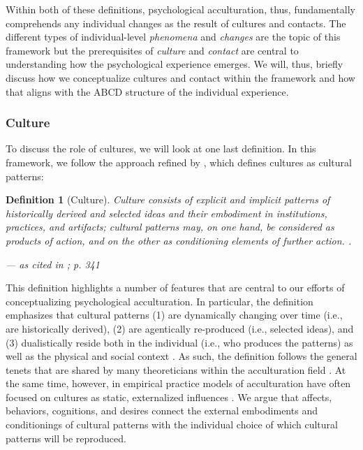 \documentclass[man, 12pt, a4paper, mask]{apa7}
\newtheorem{definition}{Definition}
\begin{document}
Within both of these definitions, psychological acculturation, thus, fundamentally comprehends any individual changes as the result of cultures and contacts. The different types of individual-level \textit{phenomena} and \textit{changes} are the topic of this framework but the prerequisites of \textit{culture} and \textit{contact} are central to understanding how the psychological experience emerges. We will, thus, briefly discuss how we conceptualize cultures and contact within the framework and how that aligns with the ABCD structure of the individual experience.
    
\subsubsection{Culture}
To discuss the role of cultures, we will look at one last definition. In this framework, we follow the approach refined by \citet[][]{adams2004}, which defines cultures as cultural patterns:
\begin{definition}[Culture]\label{def:culture}
Culture consists of explicit and implicit patterns of historically derived and selected ideas and their embodiment in institutions, practices, and artifacts; cultural patterns may, on one hand, be considered as products of action, and on the other as conditioning elements of further action. \citep[based on][p. 181]{kroeber1952}. 

\hfill--- as cited in \citealp[][]{adams2004}; p. 341
\end{definition}

This definition highlights a number of features that are central to our efforts of conceptualizing psychological acculturation. In particular, the definition emphasizes that cultural patterns (1) are dynamically changing over time (i.e., are historically derived), (2) are agentically re-produced (i.e., selected ideas), and (3) dualistically reside both in the individual (i.e., who produces the patterns) as well as the physical and social context \citep[i.e., which embodies and conditions;][]{adams2004}. As such, the definition follows the general tenets that are shared by many theoreticians within the acculturation field \citep[e.g., see][]{Berry2009, Ward2016}. At the same time, however, in empirical practice models of acculturation have often focused on cultures as static, externalized influences \citep[e.g., see the commonly (mis-)used models of][]{Berry1997b, Berry2006a}. We argue that affects, behaviors, cognitions, and desires connect the external embodiments and conditionings of cultural patterns with the individual choice of which cultural patterns will be reproduced. 
    
\end{document}
